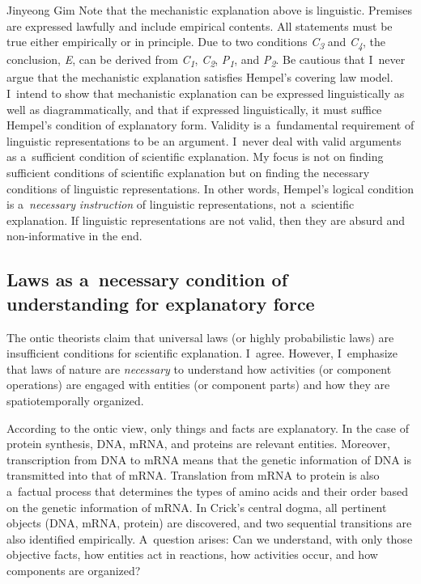 \begin{artengenv}{Jinyeong Gim}
Note that the mechanistic explanation above is linguistic. Premises are expressed lawfully and include empirical contents. All statements must be true either empirically or in principle. Due to two conditions \textit{C}\textit{\textsubscript{3}} and \textit{C}\textit{\textsubscript{4}}, the conclusion, \textit{E}, can be derived from \textit{C}\textit{\textsubscript{1}}, \textit{C}\textit{\textsubscript{2}}, \textit{P}\textit{\textsubscript{1}}, and \textit{P}\textit{\textsubscript{2}}. Be cautious that I~never argue that the mechanistic explanation satisfies Hempel's covering law model. I~intend to show that mechanistic explanation can be expressed linguistically as well as diagrammatically, and that if expressed linguistically, it must suffice Hempel's condition of explanatory form. Validity is a~fundamental requirement of linguistic representations to be an argument. I~never deal with valid arguments as a~sufficient condition of scientific explanation. My focus is not on finding sufficient conditions of scientific explanation but on finding the necessary conditions of linguistic representations. In other words, Hempel's logical condition is a~\textit{necessary} \textit{instruction} of linguistic representations, not a~scientific explanation. If linguistic representations are not valid, then they are absurd and non-informative in the end.

\subsection{Laws as a~necessary condition of understanding for explanatory force}

The ontic theorists claim that universal laws (or highly probabilistic laws) are insufficient conditions for scientific explanation. I~agree. However, I~emphasize that laws of nature are \textit{necessary} to understand how activities (or component operations) are engaged with entities (or component parts) and how they are spatiotemporally organized.

According to the ontic view, only things and facts are explanatory. In the case of protein synthesis, DNA, mRNA, and proteins are relevant entities. Moreover, transcription from DNA to mRNA means that the genetic information of DNA is transmitted into that of mRNA. Translation from mRNA to protein is also a~factual process that determines the types of amino acids and their order based on the genetic information of mRNA. In Crick's central dogma, all pertinent objects (DNA, mRNA, protein) are discovered, and two sequential transitions are also identified empirically. A~question arises: Can we understand, with only those objective facts, how entities act in reactions, how activities occur, and how components are organized?


\end{artengenv}
